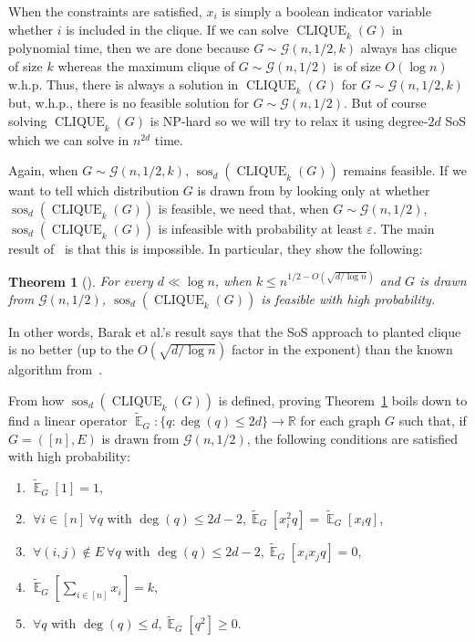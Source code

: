 \documentclass{article}[11pt]
\DeclareMathOperator{\sos}{sos}
\DeclareMathOperator{\cli}{CLIQUE}
\newcommand{\cG}{\mathcal{G}}
\newcommand{\E}{\mathop{\mathbb{E}}}
\newcommand{\tE}{\tilde{\E}}
\newtheorem{theorem}{Theorem}
\let\Oldforall\forall
\renewcommand{\forall}{~\Oldforall} %
\newcounter{theorem-preserve}
\begin{document}
When the constraints are satisfied, $x_i$ is simply a boolean indicator variable whether $i$ is included in the clique. If we can solve $\cli_k(G)$ in polynomial time, then we are done because $G \sim \cG(n, 1/2, k)$ always has clique of size $k$ whereas the maximum clique of $G \sim \cG(n, 1/2)$ is of size $O(\log n)$ w.h.p. Thus, there is always a solution in $\cli_k(G)$ for $G \sim \cG(n, 1/2, k)$ but, w.h.p., there is no feasible solution for $G \sim \cG(n, 1/2)$. But of course solving $\cli_k(G)$ is NP-hard so we will try to relax it using degree-$2d$ SoS which we can solve in $n^{2d}$ time.

Again, when $G \sim \cG(n, 1/2, k)$, $\sos_d(\cli_k(G))$ remains feasible. If we want to tell which distribution $G$ is drawn from by looking only at whether $\sos_d(\cli_k(G))$ is feasible, we need that, when $G \sim \cG(n, 1/2)$, $\sos_d(\cli_k(G))$ is infeasible with probability at least $\varepsilon$. The main result of~\cite{BHKKMP16} is that this is impossible. In particular, they show the following:

\begin{theorem}[\cite{BHKKMP16}] \label{thm:main-clique}
For every $d \ll \log n$, when $k \leq n^{1/2 - O(\sqrt{d/\log n})}$ and $G$ is drawn from $\cG(n, 1/2)$, $\sos_d(\cli_k(G))$ is feasible with high probability.
\end{theorem}

In other words, Barak et al.'s result says that the SoS approach to planted clique is no better (up to the $O(\sqrt{d/\log n})$ factor in the exponent) than the known algorithm from~\cite{AKS98}.

From how $\sos_d(\cli_k(G))$ is defined, proving Theorem~\ref{thm:main-clique}
boils down to find a linear operator ${\tE}_G: \{q: \deg(q) \leq 2d\} \rightarrow \mathbb{R}$ for each graph $G$ such that, if $G = ([n], E)$ is drawn from $\cG(n, 1/2)$, the following conditions are satisfied with high probability:
\begin{enumerate}
\item $\tE_G[1] = 1$,
\item $\forall i \in [n] \forall q$ with $ \deg(q) \leq 2d - 2, \tE_G[x_i^2q] = \tE_G[x_iq]$,
\item $\forall (i, j) \notin E \forall q$ with $\deg(q) \leq 2d - 2,\tE_G[x_ix_jq] = 0$,
\item $\tE_G[\sum_{i \in [n]} x_i] = k$,
\item $\forall q$ with $\deg(q) \leq d, \tE_G[q^2] \geq 0$.
\end{enumerate}
\end{document}
